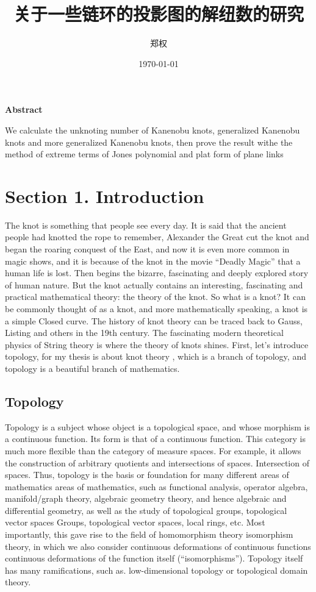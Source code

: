 \documentclass[lang=cn]{elegantpaper}
\author{郑权}
\date{\today}
\title{关于一些链环的投影图的解纽数的研究}
\begin{document}
\maketitle
\tableofcontents

\begin{ABSTRACT}
\textbf{Abstract}

We calculate the unknoting number of Kanenobu knots, generalized Kanenobu knots and
more generalized Kanenobu knots, then prove the result withe the method of extreme terms of
Jones polynomial and plat form of plane links
\end{ABSTRACT}
\tableofcontents
\section{Section 1. Introduction}
\label{sec:org095f08a}
The knot is something that people see every day. It is said that the ancient people had knotted the rope to remember, Alexander the Great cut the knot and began the roaring
conquest of the East, and now it is even more common in magic shows, and it is because of the knot in the movie ``Deadly Magic'' that a human life is lost.
Then begins the bizarre, fascinating and deeply explored story of human nature.
But the knot actually contains an interesting, fascinating and practical mathematical theory: the theory of the knot.
So what is a knot? It can be commonly thought of as a knot, and more mathematically speaking, a knot is a simple
Closed curve. The history of knot theory can be traced back to Gauss, Listing and others in the 19th century. The fascinating modern theoretical physics of
String theory is where the theory of knots shines.
First, let's introduce topology, for my thesis is about knot theory , which is a  branch of topology, and topology is a beautiful branch of mathematics.
\subsection{Topology}
\label{sec:org193c627}
Topology is a subject whose object is a topological space, and whose morphism is a continuous function.
Its form is that of a continuous function. This category is much more flexible than the category of measure spaces.
For example, it allows the construction of arbitrary quotients and intersections of spaces.
Intersection of spaces. Thus, topology is the basis or foundation for many different areas of mathematics
areas of mathematics, such as functional analysis, operator algebra, manifold/graph theory, algebraic geometry
theory, and hence algebraic and differential geometry, as well as the study of topological groups, topological vector spaces
Groups, topological vector spaces, local rings, etc. Most importantly, this gave rise to the field of homomorphism theory
isomorphism theory, in which we also consider continuous deformations of continuous functions
continuous deformations of the function itself (``isomorphisms''). Topology itself has many ramifications, such as.
low-dimensional topology or topological domain theory.
\end{document}
